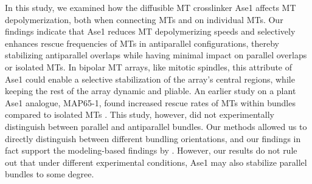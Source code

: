 In this study, we examined how the diffusible MT crosslinker Ase1 affects MT depolymerization, both when connecting MTs and on individual MTs. Our findings indicate that Ase1 reduces MT depolymerizing speeds and selectively enhances rescue frequencies of MTs in antiparallel configurations, thereby stabilizing antiparallel overlaps while having minimal impact on parallel overlaps or isolated MTs. In bipolar MT arrays, like mitotic spindles, this attribute of Ase1 could enable a selective stabilization of the array's central regions, while keeping the rest of the array dynamic and pliable. An earlier study on a plant Ase1 analogue, MAP65-1, found increased rescue rates of MTs within bundles compared to isolated MTs \parencite{Stoppin-Mellet2013}. This study, however, did not experimentally distinguish between parallel and antiparallel bundles. Our methods allowed us to directly distinguish between different bundling orientations, and our findings in fact support the modeling-based findings by \parencite{Stoppin-Mellet2013}. However, our results do not rule out that under different experimental conditions, Ase1 may also stabilize parallel bundles to some degree.

